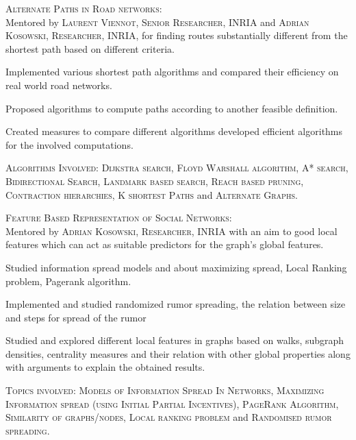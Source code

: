 \documentclass[10pt]{article}
\begin{document}
	\begin{changemargin}{1.0cm}{0.0cm} 
	{
	\large{\textsc{{Alternate Paths in Road networks:}}}  \\
	\small{Mentored by \textsc{Laurent Viennot, Senior Researcher, INRIA} and \textsc{Adrian Kosowski, Researcher, INRIA}, for finding routes substantially different from the shortest path based on different criteria.} 
	\vspace{-1mm}
	\begin{itemize}
	\setlength\itemsep{-0.05em}
	\small
	{
	\item Implemented various shortest path algorithms and compared their efficiency on real world road networks.
	\item Proposed algorithms to compute paths according to another feasible definition.
	\item Created measures to compare different algorithms developed efficient algorithms for the involved computations.
	\item \textsc{Algorithms Involved:} \textsc{Dijkstra search, Floyd Warshall algorithm, A* search, Bidirectional Search, Landmark based search, Reach based pruning, Contraction hierarchies, K shortest Paths} and \textsc{Alternate Graphs}.
	}
	\end{itemize}
			
	\large{\textsc{Feature Based Representation of Social Networks:}} \\
	\small{Mentored by \textsc{Adrian Kosowski, Researcher, INRIA} with an aim to good local features which can act as suitable predictors for the graph's global features.} 
	\vspace{-1mm}
	\begin{itemize}
	\setlength\itemsep{-0.05em}
	\small
	{
	\item Studied information spread models and about maximizing spread, Local Ranking problem, Pagerank algorithm. 
	\item Implemented and studied randomized rumor spreading, the relation between size and steps for spread of the rumor
	\item Studied and explored different local features in graphs based on walks, subgraph densities, centrality measures and their relation with other global properties along with arguments to explain the obtained results.
	\item \textsc{Topics involved:} \textsc{Models of Information Spread In Networks, Maximizing Information spread (using Initial Partial Incentives), PageRank Algorithm, Similarity of graphs/nodes, Local ranking problem} and \textsc{Randomised rumor spreading}.
	}
	\end{itemize}
 	
	}
	\end{changemargin} 	
 	
\end{document}
